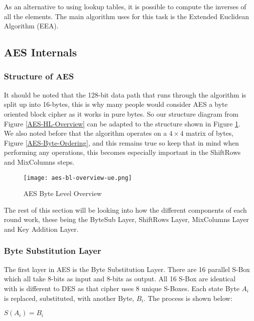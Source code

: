 As an alternative to using lookup tables, it is possible to compute the inverses of all the elements. The main algorithm uses for this task is the Extended Euclidean Algorithm (EEA).

\subsection{AES Internals}
\subsubsection{Structure of AES}

It should be noted that the 128-bit data path that runs through the algorithm is split up into 16-bytes, this is why many people would consider AES a byte oriented block cipher as it works in pure bytes. So our structure diagram from Figure \ref{AES-HL-Overview} can be adapted to the structure shown in Figure \ref{AES-BL-Overview}. We also noted before that the algorithm operates on a $4\times4$ matrix of bytes, Figure \ref{AES-Byte-Ordering}, and this remains true so keep that in mind when performing any operations, this becomes especially important in the ShiftRows and MixColumns steps.

\begin{figure}[h!]
\begin{center}
\texttt{[image: aes-bl-overview-ue.png]}
\end{center}
\caption{AES Byte Level Overview}
\label{AES-BL-Overview}
\end{figure}

The rest of this section will be looking into how the different components of each round work, these being the ByteSub Layer, ShiftRows Layer, MixColumns Layer and Key Addition Layer.

\subsubsection{Byte Substitution Layer}

The first layer in AES is the Byte Substitution Layer. There are 16 parallel S-Box which all take 8-bits as input and 8-bits as output. All 16 S-Box are identical with is different to DES as that cipher uses 8 unique S-Boxes. Each state Byte $A_i$ is replaced, substituted, with another Byte, $B_i$. The process is shown below:

\begin{center}
$S(A_i) = B_i$
\end{center}

